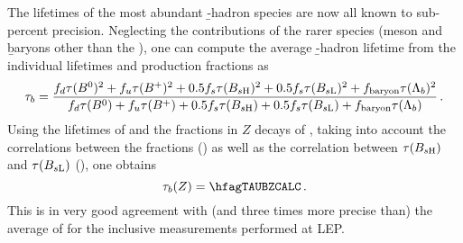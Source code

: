 The lifetimes of the most abundant \b-hadron species are now all known to sub-percent precision. Neglecting the 
contributions of the rarer species (\Bc meson and \b baryons other than the \Lb), one can compute the average 
\b-hadron lifetime from the individual lifetimes and production fractions as 
\begin{equation}
\tau_b = \frac%
{\fBd \tau(\Bd)^2+ \fBu \tau(\Bu)^2+0.5 \fBs \tau(B_{s\rm H})^2+0.5 \fBs \tau(B_{s\rm L})^2+ \fbb \tau(\Lambda_b)^2}%
{\fBd \tau(\Bd)  + \fBu \tau(\Bu)  +0.5 \fBs \tau(B_{s\rm H})  +0.5 \fBs \tau(B_{s\rm L})  + \fbb \tau(\Lambda_b)  } \,.
\end{equation}
Using the lifetimes of  and the fractions in $Z$ decays of ,
taking into account the correlations between the fractions () as well as the correlation 
between $\tau(B_{s\rm H})$ and $\tau(B_{s\rm L})$ (\hfagZRHOTAUHTAUL), one obtains
\begin{equation}
\tau_b(Z) = \hfagTAUBZCALC \,.
\end{equation}
This is in very good agreement with (and three times more precise than)
the average of  for the inclusive measurements performed at LEP. 
